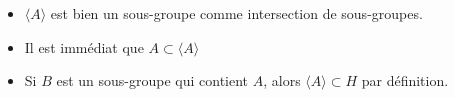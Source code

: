 \begin{myproof}{}{}
\begin{itemize}

    \item $\langle A \rangle$ est bien un sous-groupe comme intersection de sous-groupes. 
    \item Il est immédiat que $A \subset \langle A \rangle$
    \item Si $B$ est un sous-groupe qui contient $A$, alors $\langle A \rangle \subset H$ par définition.

\end{itemize}
\end{myproof}






























